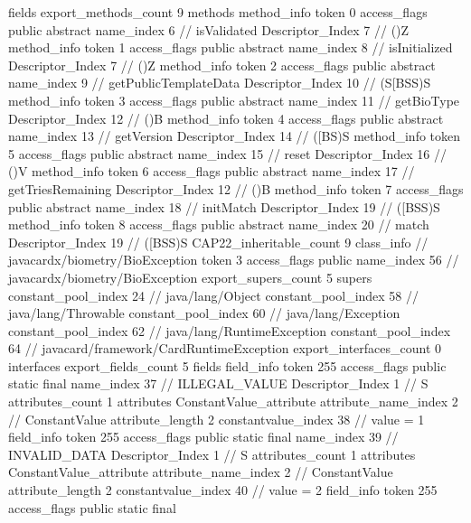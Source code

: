 {{{			fields {
			}
			export_methods_count	9
			methods {
				method_info {
					token	0
					access_flags	public abstract
					name_index	6		// isValidated
					Descriptor_Index	7		// ()Z
				}
				method_info {
					token	1
					access_flags	public abstract
					name_index	8		// isInitialized
					Descriptor_Index	7		// ()Z
				}
				method_info {
					token	2
					access_flags	public abstract
					name_index	9		// getPublicTemplateData
					Descriptor_Index	10		// (S[BSS)S
				}
				method_info {
					token	3
					access_flags	public abstract
					name_index	11		// getBioType
					Descriptor_Index	12		// ()B
				}
				method_info {
					token	4
					access_flags	public abstract
					name_index	13		// getVersion
					Descriptor_Index	14		// ([BS)S
				}
				method_info {
					token	5
					access_flags	public abstract
					name_index	15		// reset
					Descriptor_Index	16		// ()V
				}
				method_info {
					token	6
					access_flags	public abstract
					name_index	17		// getTriesRemaining
					Descriptor_Index	12		// ()B
				}
				method_info {
					token	7
					access_flags	public abstract
					name_index	18		// initMatch
					Descriptor_Index	19		// ([BSS)S
				}
				method_info {
					token	8
					access_flags	public abstract
					name_index	20		// match
					Descriptor_Index	19		// ([BSS)S
				}
			}
			CAP22_inheritable_count	9
		}
		class_info {		// javacardx/biometry/BioException
			token	3
			access_flags	public
			name_index	56		// javacardx/biometry/BioException
			export_supers_count	5
			supers {
				constant_pool_index	24		// java/lang/Object
				constant_pool_index	58		// java/lang/Throwable
				constant_pool_index	60		// java/lang/Exception
				constant_pool_index	62		// java/lang/RuntimeException
				constant_pool_index	64		// javacard/framework/CardRuntimeException
			}
			export_interfaces_count	0
			interfaces {
			}
			export_fields_count	5
			fields {
			field_info {
				token	255
				access_flags	public static final
				name_index	37		// ILLEGAL_VALUE
				Descriptor_Index	1		// S
				attributes_count	1
				attributes {
				ConstantValue_attribute {
					attribute_name_index	2		// ConstantValue
					attribute_length	2
					constantvalue_index	38		// value = 1
				}
				}
			}
			field_info {
				token	255
				access_flags	public static final
				name_index	39		// INVALID_DATA
				Descriptor_Index	1		// S
				attributes_count	1
				attributes {
				ConstantValue_attribute {
					attribute_name_index	2		// ConstantValue
					attribute_length	2
					constantvalue_index	40		// value = 2
				}
				}
			}
			field_info {
				token	255
				access_flags	public static final
}}}}}

